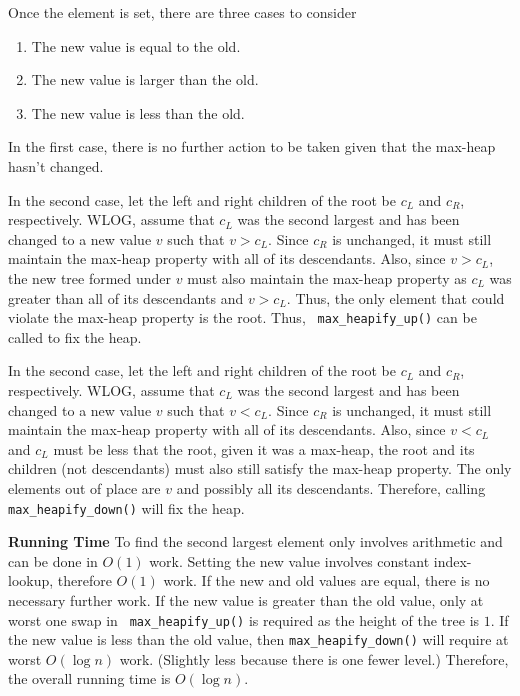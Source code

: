 \documentclass[12pt,twoside]{article}
\begin{document}
\begin{problems}
\begin{problemparts}
    Once the element is set, there are three cases to consider
    \begin{enumerate}
        \item The new value is equal to the old.
        \item The new value is larger than the old.
        \item The new value is less than the old.
    \end{enumerate}

    In the first case, there is no further action to be taken given that the
    max-heap hasn't changed.

    In the second case, let the left and right children of the root be $ c_L
    $ and $ c_R $, respectively. WLOG, assume that $ c_L $ was the second
    largest and has been changed to a new value $ v $ such that $ v > c_L $.
    Since $ c_R $ is unchanged, it must still maintain the max-heap property
    with all of its descendants. Also, since $ v > c_L $, the new tree formed
    under $ v $ must also maintain the max-heap property as $ c_L $ was
    greater than all of its descendants and $ v > c_L $. Thus, the only
    element that could violate the max-heap property is the root. Thus, {\tt
    max\_heapify\_up()} can be called to fix the heap.
    
    In the second case, let the left and right children of the root be $ c_L
    $ and $ c_R $, respectively. WLOG, assume that $ c_L $ was the second
    largest and has been changed to a new value $ v $ such that $ v < c_L $.
    Since $ c_R $ is unchanged, it must still maintain the max-heap property
    with all of its descendants. Also, since $ v < c_L $ and $ c_L $ must be
    less that the root, given it was a max-heap, the root and its children
    (not descendants) must also still satisfy the max-heap property. The only
    elements out of place are $ v $ and possibly all its descendants.
    Therefore, calling {\tt max\_heapify\_down()} will fix the heap.

    \smallbreak

    {\bf Running Time} To find the second largest element only involves
    arithmetic and can be done in $ O(1) $ work. Setting the new value
    involves constant index-lookup, therefore $ O(1) $ work. If the new and
    old values are equal, there is no necessary further work. If the new
    value is greater than the old value, only at worst one swap in {\tt
    max\_heapify\_up()} is required as the height of the tree is $ 1 $. If
    the new value is less than the old value, then {\tt max\_heapify\_down()}
    will require at worst $ O(\log n) $ work. (Slightly less because there is
    one fewer level.) Therefore, the overall running time is $ O(\log n) $.


\end{problemparts}
\end{problems}
\end{document}
